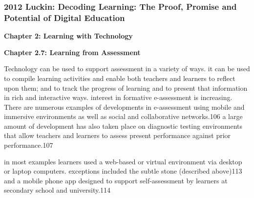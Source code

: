 \subsubsection{2012 Luckin: Decoding Learning: The Proof, Promise and Potential of Digital Education}

\textbf{Chapter 2: Learning with Technology}

\textbf{Chapter 2.7: Learning from Assessment}

Technology can be used to support assessment in a variety of ways. it can be used to compile learning activities and enable both teachers and learners to reflect upon them; and to track the progress of learning and to present that information in rich and interactive ways.
interest in formative e-assessment is increasing. There are numerous examples of developments in e-assessment using mobile and immersive environments as well as social and collaborative networks.106 a large amount of development has also taken place on diagnostic testing environments that allow teachers and learners to assess present performance against prior performance.107

in most examples learners used a web-based or virtual environment via desktop or laptop computers. exceptions included the subtle stone (described above)113 and a mobile phone app designed to support self-assessment by learners at secondary school and university.114